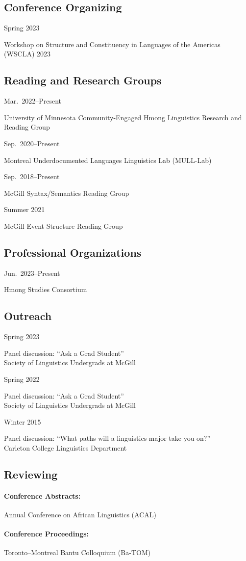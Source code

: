 \documentclass[11pt,oneside,DIV=calc,parskip=off]{scrarticle} %
\newlength{\leftcolwidth}
\newlength{\rightcolwidth}
\newlength{\spacingbefore}
\newlength{\spacingafter}
\newcommand{\mytwocol}[2]{%
	\vspace{\spacingbefore}%
	\begin{minipage}[t]{\leftcolwidth}%
		\strut#1%
	\end{minipage}%
	\begin{minipage}[t]{\rightcolwidth}%
		\strut#2%
	\end{minipage}%
	\vspace{\spacingafter}\par%
	}
\newcommand{\cvline}[2]{%
	\mytwocol{#1}{#2}%
	}
\begin{document}
\subsection{Conference Organizing}
\cvline{Spring 2023}{Workshop on Structure and Constituency in Languages of the Americas (WSCLA) 2023}

\subsection{Reading and Research Groups}
\cvline{Mar.\ 2022--Present}{University of Minnesota Community-Engaged Hmong Linguistics Research and Reading Group}
\cvline{Sep.\ 2020--Present}{Montreal Underdocumented Languages Linguistics Lab (MULL-Lab)}
\cvline{Sep.\ 2018--Present}{McGill Syntax/Semantics Reading Group}
\cvline{Summer 2021}{McGill Event Structure Reading Group}

\subsection{Professional Organizations}
\cvline{Jun.\ 2023--Present}{Hmong Studies Consortium}

\subsection{Outreach}
\cvline{Spring 2023}{Panel discussion: ``Ask a Grad Student''\\Society of Linguistics Undergrads at McGill}
\cvline{Spring 2022}{Panel discussion: ``Ask a Grad Student''\\Society of Linguistics Undergrads at McGill}
\cvline{Winter 2015}{Panel discussion: ``What paths will a linguistics major take you on?''\\Carleton College Linguistics Department}

\subsection{Reviewing}
\paragraph{Conference Abstracts:} Annual Conference on African Linguistics (ACAL)
\paragraph{Conference Proceedings:} Toronto--Montreal Bantu Colloquium (Ba-TOM)
\end{document}
